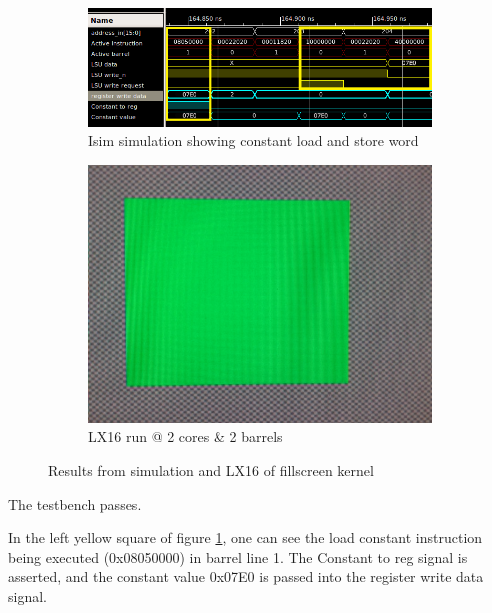 \documentclass[../main/report.tex]{subfiles}
\begin{document}
\begin{figure}[H]
  \centering
  \begin{subfigure}[b]{\textwidth}
    \includegraphics[width=\textwidth]{../testing/assets/Constant_load_&_store.png}
    \caption{Isim simulation showing constant load and store word}
    \label{fig:isim-kernel-parameterization}
  \end{subfigure}
  \begin{subfigure}[b]{0.3\textwidth}
    \includegraphics[width=\textwidth]{../testing/assets/green_screen.jpg}
    \caption{LX16 run @ 2 cores \& 2 barrels}
    \label{fig:LX16-kernel-parameterization}
  \end{subfigure}
  \caption{Results from simulation and LX16 of fillscreen kernel}
\end{figure}

The testbench passes.

In the left yellow square of figure \ref{fig:isim-kernel-parameterization}, one can see the load constant instruction being executed (0x08050000) in barrel line 1.
The Constant to reg signal is asserted, and the constant value 0x07E0 is passed into the register write data signal.
\end{document}
